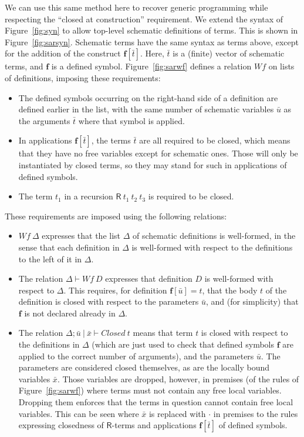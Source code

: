 \documentclass{article}
\begin{document}
We can use this same method here to recover generic programming while
respecting the ``closed at construction'' requirement.  We extend the
syntax of Figure~\ref{fig:syn} to allow top-level schematic
definitions of terms.  This is shown in Figure~\ref{fig:sarsyn}.
Schematic terms have the same syntax as terms above, except
for the addition of the construct $\mathbf{f}[\bar{t}]$.  Here,
$\bar{t}$ is a (finite) vector of schematic terms, and $\mathbf{f}$ is
a defined symbol.  Figure~\ref{fig:sarwf} defines a relation $\textit{Wf}$
on lists of definitions, imposing these requirements:
\begin{itemize}
\item The defined symbols occurring on the right-hand side of a definition
  are defined earlier in the list, with
  the same number of schematic variables $\bar{u}$ as the arguments $\bar{t}$
  where that symbol is applied.
\item In applications $\mathbf{f}[\bar{t}]$, the terms $\bar{t}$ are
  all required to be closed, which means that they have no free variables
  except for schematic ones.  Those will only be instantiated by closed
  terms, so they may stand for such in applications of defined symbols.
\item The term $t_1$ in a recursion $\mathsf{R}\ t_1\ t_2\ t_3$ is
  required to be closed.
  \end{itemize}
These requirements are imposed using the following relations:
\begin{itemize}
\item $\textit{Wf}\ \Delta$ expresses that the list $\Delta$ of
  schematic definitions is well-formed, in the sense that
each definition in $\Delta$ is well-formed with respect to the definitions
to the left of it in $\Delta$.
\item The relation $\Delta \vdash \textit{Wf}\ D$ expresses
  that definition $D$ is well-formed with respect to $\Delta$.  This requires, for definition
  $\mathbf{f}[\bar{u}] = t$, that the body $t$ of the
  definition is closed with respect to the parameters $\bar{u}$, and
  (for simplicity) that $\mathbf{f}$ is not declared already in $\Delta$.
\item The relation $\Delta; \bar{u}\ |\ \bar{x} \vdash
  \textit{Closed}\ t$ means that term $t$ is closed with respect to
  the definitions in $\Delta$ (which are just used to check that
  defined symbols $\mathbf{f}$ are applied to the correct number of
  arguments), and the parameters $\bar{u}$.  The parameters are
  considered closed themselves, as are the locally bound variables
  $\bar{x}$.  Those variables are dropped, however, in premises
  (of the rules of Figure~\ref{fig:sarwf}) where
  terms must not contain any free local variables.  Dropping them
  enforces that the terms in question cannot contain free local variables.
  This can be seen
  where $\bar{x}$ is replaced with $\cdot$ in premises to the rules
  expressing closedness of $\mathsf{R}$-terms and applications
  $\mathbf{f}[\bar{t}]$ of defined symbols.
\end{itemize}
\end{document}
